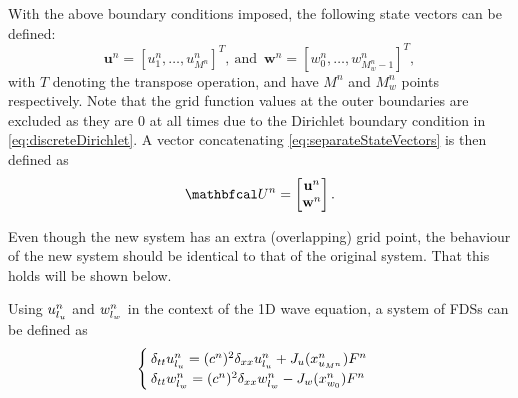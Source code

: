 With the above boundary conditions imposed, the following state vectors can be defined:
\begin{equation}
    \label{eq:separateStateVectors}
     \mathbf{u}^n = [u_1^n, \hdots, u_{M^n}^n]^T\!, \  \text{and} \ \; \mathbf{w}^n = [w_0^n, \hdots, w_{M_w^n-1}^n]^T,
\end{equation}
with $T$ denoting the transpose operation, and have $M^n$ and $M_{w}^n$ points respectively. Note that the grid function values at the outer boundaries are excluded as they are 0 at all times due to the Dirichlet boundary condition in \eqref{eq:discreteDirichlet}. A vector concatenating \eqref{eq:separateStateVectors} is then defined as 
\begin{equation}\label{eq:fullState}
    \U^n = \begin{bmatrix}
        \mathbf{u}^n \\
        \mathbf{w}^n
    \end{bmatrix}.
\end{equation}

Even though the new system has an extra (overlapping) grid point, the behaviour of the new system should be identical to that of the original system. That this holds will be shown below.

Using $u_{l_u}^n$ and $w_{l_w}^n$ in the context of the 1D wave equation, a system of FDSs can be defined as
\begin{equation}
    \begin{cases}\label{eq:systemHalfStrings}
        \delta_{tt}u_{l_u}^n = (c^n)^2\delta_{xx}u_{l_u}^n + J_u(x_{u_{M^n}}^n)F^n\\
        \delta_{tt}w_{l_w}^n = (c^n)^2\delta_{xx}w_{l_w}^n - J_w(x_{w_0}^n)F^n
    \end{cases}
\end{equation}

